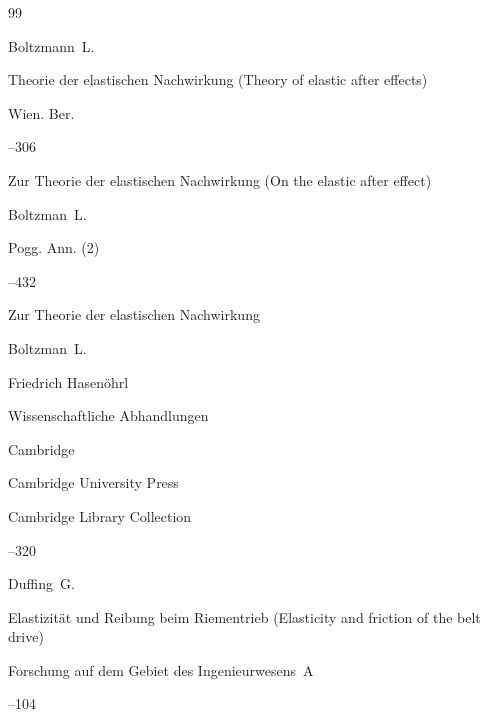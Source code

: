 \begin{thebibliography}{99}

\by Boltzmann~L.

\paper Theorie der elastischen Nachwirkung (Theory of elastic after effects)


\jour Wien. Ber.



–306\!\!

\moreref

\paper 	Zur Theorie der elastischen Nachwirkung (On the elastic after effect)

\by    Boltzman~L.


\jour Pogg. Ann. \rm (2)


--432\!\! 


\moreref

\paper 	Zur Theorie der elastischen Nachwirkung 

\by    Boltzman~L.

\ed  Friedrich Hasen\"ohrl

\inbook Wissenschaftliche Abhandlungen


\publaddr Cambridge

\publ Cambridge University Press


\serial Cambridge Library Collection

--320







\by Duffing~G.

\paper Elastizit\"at und Reibung beim Riementrieb (Elasticity and friction of the belt drive)

\jour Forschung auf dem Gebiet des Ingenieurwesens~A



--104








\end{thebibliography}
